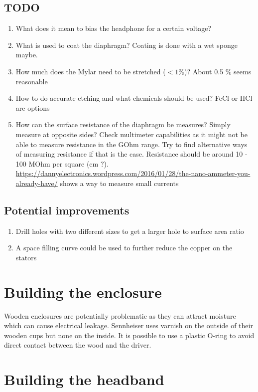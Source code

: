 \documentclass{article}
\begin{document}
\subsection{TODO}
\begin{enumerate}
    \item What does it mean to bias the headphone for a certain voltage?
    \item What is used to coat the diaphragm? Coating is done with a wet sponge maybe.
    \item How much does the Mylar need to be stretched ($< 1\%$)? About 0.5 \% seems reasonable
    \item How to do accurate etching and what chemicals should be used? FeCl or HCl are options
    \item How can the surface resistance of the diaphragm be measures? Simply measure at opposite sides? Check multimeter capabilities as it might not be able to measure resistance in the GOhm range. Try to find alternative ways of measuring resistance if that is the case. Resistance should be around 10 - 100 MOhm per square (cm ?). \url{https://dannyelectronics.wordpress.com/2016/01/28/the-nano-ammeter-you-already-have/} shows a way to measure small currents
\end{enumerate}

\subsection{Potential improvements}
\begin{enumerate}
    \item Drill holes with two different sizes to get a larger hole to surface area ratio
    \item A space filling curve could be used to further reduce the copper on the stators
\end{enumerate}

\section{Building the enclosure}
\label{s:enclosure}
Wooden enclosures are potentially problematic as they can attract moisture which can cause electrical leakage. Sennheiser uses varnish on the outside of their wooden cups but none on the inside. It is possible to use a plastic O-ring to avoid direct contact between the wood and the driver.

\section{Building the headband}
\label{s:headband}
\end{document}
